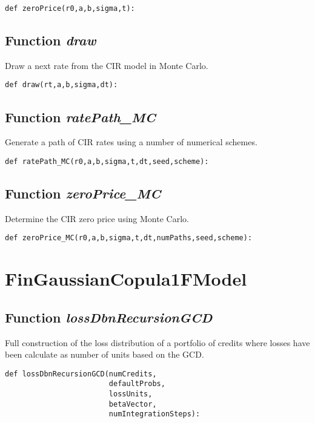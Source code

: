 \documentclass[twoside,11pt]{book}
\begin{document}
\begin{lstlisting}
def zeroPrice(r0,a,b,sigma,t):
\end{lstlisting}

\subsection{Function {\it draw}}
Draw a next rate from the CIR model in Monte Carlo. 

\begin{lstlisting}
def draw(rt,a,b,sigma,dt):
\end{lstlisting}

\subsection{Function {\it ratePath\_MC}}
Generate a path of CIR rates using a number of numerical schemes. 

\begin{lstlisting}
def ratePath_MC(r0,a,b,sigma,t,dt,seed,scheme):
\end{lstlisting}

\subsection{Function {\it zeroPrice\_MC}}
Determine the CIR zero price using Monte Carlo. 

\begin{lstlisting}
def zeroPrice_MC(r0,a,b,sigma,t,dt,numPaths,seed,scheme):
\end{lstlisting}

\newpage
\section{FinGaussianCopula1FModel}

\subsection{Function {\it lossDbnRecursionGCD}}
Full construction of the loss distribution of a portfolio of credits where losses have been calculate as number of units based on the GCD. 

\begin{lstlisting}
def lossDbnRecursionGCD(numCredits, 
                        defaultProbs, 
                        lossUnits,
                        betaVector,
                        numIntegrationSteps):
\end{lstlisting}
\end{document}
